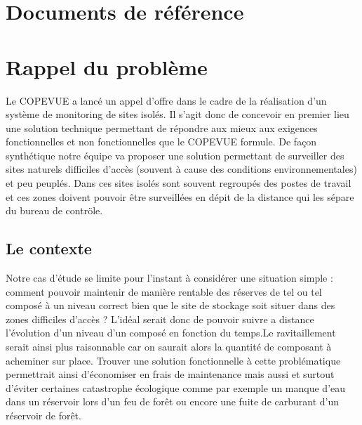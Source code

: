     \chapter{Documents de référence}
    
    \chapter{Rappel du problème}
Le COPEVUE a lancé un appel d'offre dans le cadre de la réalisation d'un système de monitoring de sites isolés. Il s'agit donc de concevoir en premier lieu une solution technique permettant de répondre aux mieux aux exigences fonctionnelles et non fonctionnelles que le COPEVUE formule. De façon synthétique notre équipe va proposer une solution permettant de surveiller des sites naturels difficiles d'accès (souvent à cause des conditions environnementales) et peu peuplés. Dans ces sites isolés sont souvent regroupés des postes de travail et ces zones doivent pouvoir être surveillées en dépit de la distance qui les sépare du bureau de contröle.
    \section{Le contexte}
Notre cas d'étude se limite pour l'instant à considérer une situation simple : comment pouvoir maintenir de manière rentable des réserves de tel ou tel composé à un niveau correct bien que le site de stockage soit situer dans des zones difficiles d'accès ? L'idéal serait donc de pouvoir suivre a distance l'évolution d'un niveau d'un composé en fonction du temps.Le ravitaillement serait ainsi plus raisonnable car on saurait alors la quantité de composant à acheminer sur place. Trouver une solution fonctionnelle à cette problématique permettrait ainsi d'économiser en frais de maintenance mais aussi et surtout d'éviter certaines catastrophe écologique comme par exemple un manque d'eau dans un réservoir lors d'un feu de forêt ou encore une fuite de carburant d'un réservoir de forêt.
